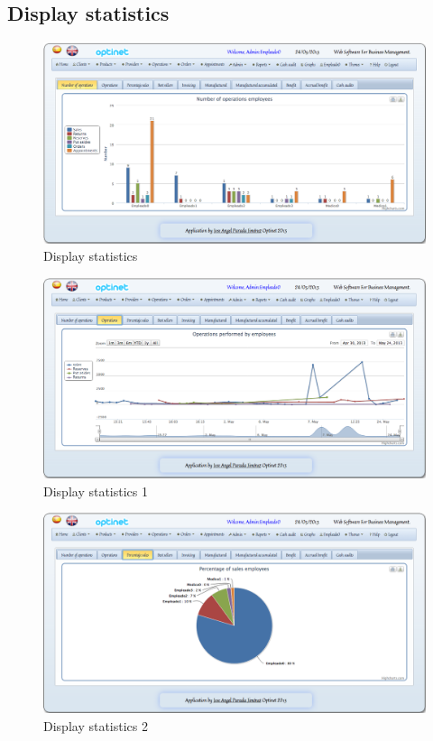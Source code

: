\documentclass[a4paper,11pt]{book}
\begin{document}
\newpage
\subsection {Display statistics}

\begin{figure}[!htb]
  \centering
    \includegraphics[scale=0.35]{icapestadisticas.png}
  \caption{Display statistics}
  \label{a}
\end{figure}

\begin{figure}[!htb]
  \centering
    \includegraphics[scale=0.35]{icapestadisticas1.png}
  \caption{Display statistics 1}
  \label{a}
\end{figure}

\newpage
\begin{figure}[!htb]
  \centering
    \includegraphics[scale=0.35]{icapestadisticas2.png}
  \caption{Display statistics 2}
  \label{a}
\end{figure}
\end{document}
